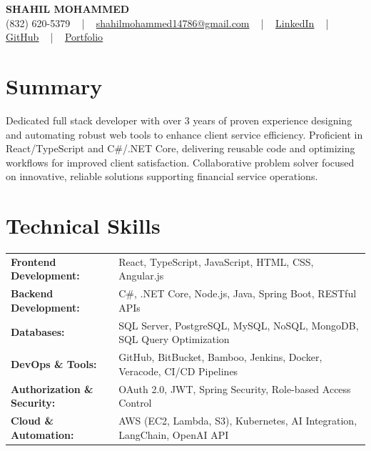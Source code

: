 \documentclass[letterpaper,11pt]{article}
\begin{document}
\begin{center}
    {\fontsize{14pt}{12pt}\selectfont \textbf{\MakeUppercase{Shahil Mohammed}}}\\ \vspace{2pt}
    \fontsize{10pt}{12pt}\selectfont (832) 620-5379 ~ | ~ \href{mailto:shahilmohammed14786@gmail.com}{shahilmohammed14786@gmail.com} ~ | ~  
    \href{https://www.linkedin.com/in/shahil-mohammed-9652931a1/}{\color{blue}\underline{LinkedIn}}  ~ | ~ 
    \href{https://github.com/freakbeast14}{\color{blue}\underline{GitHub}} ~ | ~ 
    \href{https://shahil-mohammed.netlify.app/}{\color{blue}\underline{Portfolio}}
    \vspace{-8pt}
\end{center}

\section{Summary}
\fontsize{9pt}{10pt}\selectfont
Dedicated full stack developer with over 3 years of proven experience designing and automating robust web tools to enhance client service efficiency. Proficient in React/TypeScript and C#/.NET Core, delivering reusable code and optimizing workflows for improved client satisfaction. Collaborative problem solver focused on innovative, reliable solutions supporting financial service operations.
 \vspace{-5pt}
 
\section{Technical Skills}
        \vspace{-14pt}
        \begin{table}[h]
            \fontsize{9pt}{10pt}\selectfont
            \begin{tabular}{p{0.3\linewidth} p{0.7\linewidth}}
                \textbf{Frontend Development:} & React, TypeScript, JavaScript, HTML, CSS, Angular.js \\
                \textbf{Backend Development:} & C#, .NET Core, Node.js, Java, Spring Boot, RESTful APIs \\
                \textbf{Databases:} & SQL Server, PostgreSQL, MySQL, NoSQL, MongoDB, SQL Query Optimization \\
                \textbf{DevOps \& Tools:} & GitHub, BitBucket, Bamboo, Jenkins, Docker, Veracode, CI/CD Pipelines \\
                \textbf{Authorization \& Security:} & OAuth 2.0, JWT, Spring Security, Role-based Access Control \\
                \textbf{Cloud \& Automation:} & AWS (EC2, Lambda, S3), Kubernetes, AI Integration, LangChain, OpenAI API \\
            \end{tabular}
        \end{table}
 \vspace{-15pt}
 
\end{document}
